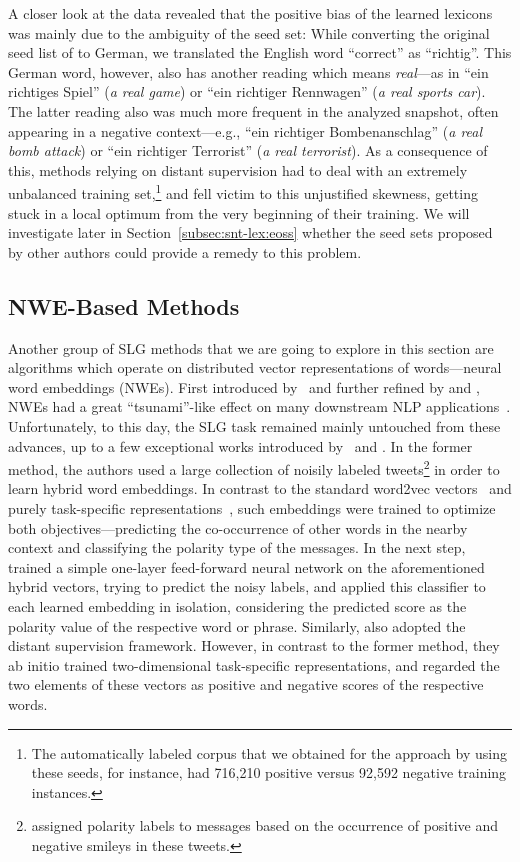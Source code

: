 A closer look at the data revealed that the positive bias of the
learned lexicons was mainly due to the ambiguity of the seed set:
While converting the original seed list of \citet{Turney:03} to
German, we translated the English word ``correct'' as ``richtig''.
This German word, however, also has another reading which means
\emph{real}---as in ``ein richtiges Spiel'' (\emph{a real game}) or
``ein richtiger Rennwagen'' (\emph{a real sports car}).  The latter
reading also was much more frequent in the analyzed snapshot, often
appearing in a negative context---e.g., ``ein richtiger
Bombenanschlag'' (\emph{a real bomb attack}) or ``ein richtiger
Terrorist'' (\emph{a real terrorist}).  As a consequence of this,
methods relying on distant supervision had to deal with an extremely
unbalanced training set,\footnote{The automatically labeled corpus
  that we obtained for the approach by \citet{Kiritchenko:14} using
  these seeds, for instance, had 716,210 positive versus 92,592
  negative training instances.} and fell victim to this unjustified
skewness, getting stuck in a local optimum from the very beginning of
their training.  We will investigate later in
Section~\ref{subsec:snt-lex:eoss} whether the seed sets proposed by
other authors could provide a remedy to this problem.

\subsection{NWE-Based Methods}\label{subsec:snt:lex:nwe}

Another group of SLG methods that we are going to explore in this
section are algorithms which operate on distributed vector
representations of words---neural word embeddings (NWEs).  First
introduced by~\citet{Bengio:03} and further refined by
\citet{Collobert:11} and \citet{Mikolov:13}, NWEs had a great
``tsunami''-like effect on many downstream NLP
applications~\cite{Manning:15}.  Unfortunately, to this day, the SLG
task remained mainly untouched from these advances, up to a few
exceptional works introduced by~\citet{Tang:14a} and \citet{Vo:16}.
In the former method, the authors used a large collection of noisily
labeled tweets\footnote{\citet{Tang:14a} assigned polarity labels to
  messages based on the occurrence of positive and negative smileys in
  these tweets.}  in order to learn hybrid word embeddings.  In
contrast to the standard word2vec vectors~\cite{Mikolov:13} and purely
task-specific representations~\cite{Collobert:11}, such embeddings
were trained to optimize both objectives---predicting the
co-occurrence of other words in the nearby context and classifying the
polarity type of the messages.  In the next step, \citet{Tang:14a}
trained a simple one-layer feed-forward neural network on the
aforementioned hybrid vectors, trying to predict the noisy labels, and
applied this classifier to each learned embedding in isolation,
considering the predicted score as the polarity value of the
respective word or phrase.  Similarly, \citet{Vo:16} also adopted the
distant supervision framework.  However, in contrast to the former
method, they ab initio trained two-dimensional task-specific
representations, and regarded the two elements of these vectors as
positive and negative scores of the respective words.

